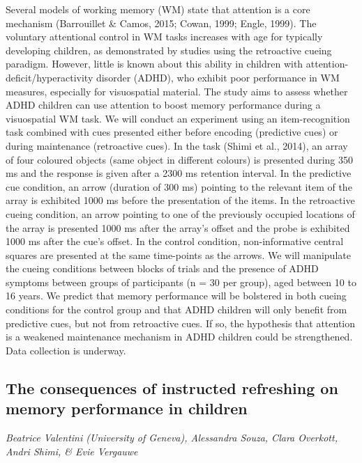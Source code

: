 \documentclass[
  12pt,
]{book}
\begin{document}
Several models of working memory (WM) state that attention is a core mechanism (Barrouillet \& Camos, 2015; Cowan, 1999; Engle, 1999). The voluntary attentional control in WM tasks increases with age for typically developing children, as demonstrated by studies using the retroactive cueing paradigm. However, little is known about this ability in children with attention-deficit/hyperactivity disorder (ADHD), who exhibit poor performance in WM measures, especially for visuospatial material. The study aims to assess whether ADHD children can use attention to boost memory performance during a visuospatial WM task. We will conduct an experiment using an item-recognition task combined with cues presented either before encoding (predictive cues) or during maintenance (retroactive cues). In the task (Shimi et al., 2014), an array of four coloured objects (same object in different colours) is presented during 350 ms and the response is given after a 2300 ms retention interval. In the predictive cue condition, an arrow (duration of 300 ms) pointing to the relevant item of the array is exhibited 1000 ms before the presentation of the items. In the retroactive cueing condition, an arrow pointing to one of the previously occupied locations of the array is presented 1000 ms after the array's offset and the probe is exhibited 1000 ms after the cue's offset. In the control condition, non-informative central squares are presented at the same time-points as the arrows. We will manipulate the cueing conditions between blocks of trials and the presence of ADHD symptoms between groups of participants (n = 30 per group), aged between 10 to 16 years. We predict that memory performance will be bolstered in both cueing conditions for the control group and that ADHD children will only benefit from predictive cues, but not from retroactive cues. If so, the hypothesis that attention is a weakened maintenance mechanism in ADHD children could be strengthened. Data collection is underway.

\hypertarget{the-consequences-of-instructed-refreshing-on-memory-performance-in-children}{%
\subsection{The consequences of instructed refreshing on memory performance in children}\label{the-consequences-of-instructed-refreshing-on-memory-performance-in-children}}

\emph{Beatrice Valentini (University of Geneva), Alessandra Souza, Clara Overkott, Andri Shimi, \& Evie Vergauwe}
\end{document}
